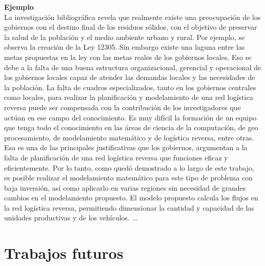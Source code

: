 {\bf Ejemplo}\\
La investigación bibliográfica revela que realmente existe una preocupación de los gobiernos con el destino final de los residuos sólidos, con el objetivo de preservar la salud de la población y el medio ambiente urbano y rural. Por ejemplo, se observa la creación de la Ley 12305. Sin embargo existe una laguna entre las metas propuestas en la ley con las metas reales de los gobiernos locales. Eso se debe a la falta de una buena estructura organizacional, gerencial y operacional de los gobiernos locales capaz de atender las demandas locales y las necesidades de la población.
\vskip 0.3cm
La falta de cuadros especializados, tanto en los gobiernos centrales como locales, para realizar la planificación y modelamiento de una red logística reversa puede ser compensada con la contribución de los investigadores que actúan en ese campo del conocimiento. Es muy difícil la formación de un equipo que tenga todo el conocimiento en las áreas de ciencia de la computación, de geo procesamiento, de modelamiento matemático y de logística reversa, entre otras. Esa es una de las principales justificativas que los gobiernos, argumentan a la falta de planificación de una red logística reversa que funciones eficaz y eficientemente. 
\vskip 0.3cm
Por lo tanto, como quedó demostrado a lo largo de este trabajo, es posible realizar el modelamiento matemático para este tipo de problema con baja inversión, así como aplicarlo en varias regiones sin necesidad de grandes cambios en el modelamiento propuesto. El modelo propuesto calcula los flujos en la red logística reversa, permitiendo dimensionar la cantidad y capacidad de las unidades productivas y de los vehículos. 
\vskip 0.3cm
...


\section{Trabajos futuros}



\cleardoublepage
{}


